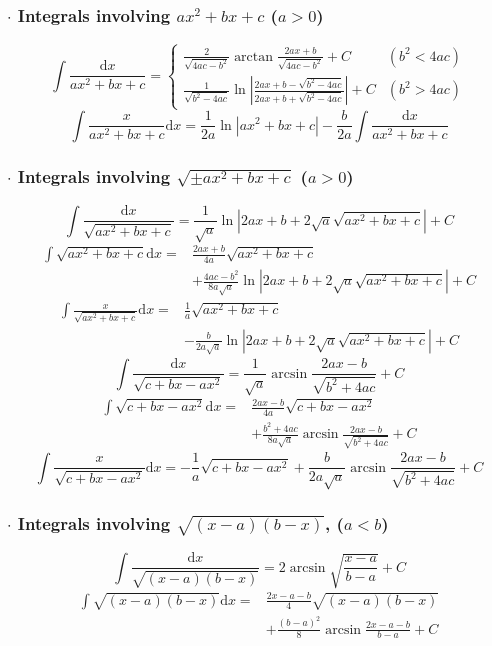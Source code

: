 \newcommand{\md}{\mathrm{d}}
\newcommand{\me}{\mathrm{e}}


\subsubsection*{$\cdot$ Integrals involving $ax^2+bx+c$ ($a>0$)}
\[ 
\int \frac{\md x}{ax^2+bx+c} = \begin{cases}
\frac{2}{\sqrt{4ac-b^2}}\arctan\frac{2ax+b}{\sqrt{4ac-b^2}} + C & (b^2 < 4ac) \\[2ex]
\frac{1}{\sqrt{b^2-4ac}}\ln\left| \frac{2ax+b-\sqrt{b^2-4ac}}{2ax+b+\sqrt{b^2-4ac}} \right| + C & (b^2 > 4ac)
\end{cases} 
\]
\[ 
\int \frac{x}{ax^2+bx+c} \md x = \frac{1}{2a} \ln |ax^2+bx+c| - \frac{b}{2a} \int \frac{\md x}{ax^2+bx+c} 
\]

\subsubsection*{$\cdot$ Integrals involving $\sqrt{\pm ax^2+bx+c}$ ($a>0$)}
\[ 
\int \frac{\md x}{\sqrt{ax^2+bx+c}} = \frac{1}{\sqrt{a}} \ln \left| 2ax+b+2\sqrt{a}\sqrt{ax^2+bx+c} \right| + C 
\]
\[ 
\begin{split}
\int \sqrt{ax^2+bx+c} \md x = {}& \frac{2ax+b}{4a}\sqrt{ax^2+bx+c} \\
& + \frac{4ac-b^2}{8a\sqrt{a}}\ln \left|2ax+b+2\sqrt{a}\sqrt{ax^2+bx+c}\right| + C 
\end{split}
\]
\[ 
\begin{split}
\int \frac{x}{\sqrt{ax^2+bx+c}} \md x = {}& \frac{1}{a}\sqrt{ax^2+bx+c} \\
& - \frac{b}{2a\sqrt{a}}\ln \left| 2ax+b+2\sqrt{a}\sqrt{ax^2+bx+c} \right| + C 
\end{split}
\]
\[ 
\int \frac{\md x}{\sqrt{c+bx-ax^2}} = \frac{1}{\sqrt{a}} \arcsin \frac{2ax-b}{\sqrt{b^2+4ac}} + C  
\]
\[ 
\begin{split}
\int \sqrt{c+bx-ax^2} \md x = {}& \frac{2ax-b}{4a}\sqrt{c+bx-ax^2} \\
& + \frac{b^2+4ac}{8a\sqrt{a}}\arcsin\frac{2ax-b}{\sqrt{b^2+4ac}} + C 
\end{split}
\]
\[ 
\int \frac{x}{\sqrt{c+bx-ax^2}} \md x = -\frac{1}{a}\sqrt{c+bx-ax^2} + \frac{b}{2a\sqrt{a}}\arcsin\frac{2ax-b}{\sqrt{b^2+4ac}} + C 
\]


\subsubsection*{$\cdot$ Integrals involving $\sqrt{(x-a)(b-x)}$, ($a<b$)}
\[ 
\int \frac{\md x}{\sqrt{(x-a)(b-x)}} = 2\arcsin\sqrt{\frac{x-a}{b-a}} + C
\]
\[ 
\begin{split}
\int \sqrt{(x-a)(b-x)} \md x = {}& \frac{2x-a-b}{4}\sqrt{(x-a)(b-x)} \\
& + \frac{(b-a)^2}{8}\arcsin\frac{2x-a-b}{b-a} + C
\end{split}
\]

